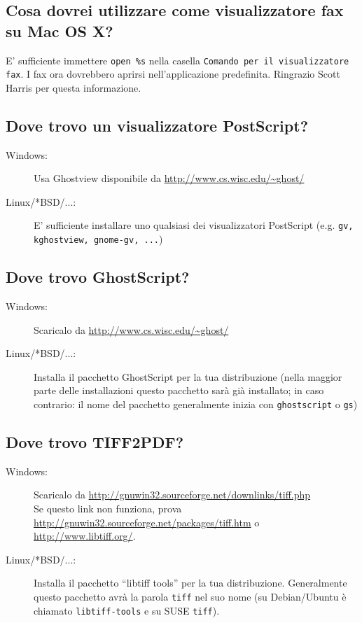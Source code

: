 \documentclass[a4paper,10pt]{scrartcl}
\begin{document}
\subsection{Cosa dovrei utilizzare come visualizzatore fax su Mac OS X?}
E' sufficiente immettere \verb.open %s. nella casella \texttt{Comando per il visualizzatore fax}.
I fax ora dovrebbero aprirsi nell'applicazione predefinita.
Ringrazio Scott Harris per questa informazione.


\subsection{Dove trovo un visualizzatore PostScript?}
\begin{description}
\item[Windows:] Usa Ghostview disponibile da \url{http://www.cs.wisc.edu/~ghost/}
\item[Linux/*BSD/...:] E' sufficiente installare uno qualsiasi dei visualizzatori PostScript
                (e.g. \texttt{gv, kghostview, gnome-gv, ...})
\end{description}

\subsection{Dove trovo GhostScript?}
\begin{description}
\item[Windows:] Scaricalo da \url{http://www.cs.wisc.edu/~ghost/}
\item[Linux/*BSD/...:] Installa il pacchetto GhostScript per la tua distribuzione (nella maggior parte delle installazioni questo pacchetto sarà già installato; in caso contrario: il nome del pacchetto generalmente inizia con \texttt{ghostscript} o \texttt{gs})
\end{description}

\subsection{Dove trovo TIFF2PDF?}
\begin{description}
\item[Windows:] Scaricalo da \url{http://gnuwin32.sourceforge.net/downlinks/tiff.php}\\ Se questo link non funziona, prova \url{http://gnuwin32.sourceforge.net/packages/tiff.htm} o \url{http://www.libtiff.org/}.
\item[Linux/*BSD/...:] Installa il pacchetto ``libtiff tools'' per la tua distribuzione. Generalmente questo pacchetto avrà la parola \texttt{tiff} nel suo nome (su Debian/Ubuntu è chiamato \texttt{libtiff-tools} e su SUSE \texttt{tiff}).
\end{description}
\end{document}

